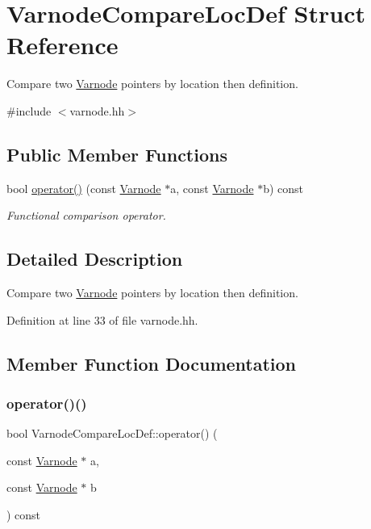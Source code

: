 \hypertarget{struct_varnode_compare_loc_def}{}\section{Varnode\+Compare\+Loc\+Def Struct Reference}
\label{struct_varnode_compare_loc_def}


Compare two \mbox{\hyperlink{class_varnode}{Varnode}} pointers by location then definition.  




{\ttfamily \#include $<$varnode.\+hh$>$}

\subsection*{Public Member Functions}
\begin{DoxyCompactItemize}
\item 
bool \mbox{\hyperlink{struct_varnode_compare_loc_def_a8874edc42984b5bf108b5ff6dc0d054f}{operator()}} (const \mbox{\hyperlink{class_varnode}{Varnode}} $\ast$a, const \mbox{\hyperlink{class_varnode}{Varnode}} $\ast$b) const
\begin{DoxyCompactList}\small\item\em Functional comparison operator. \end{DoxyCompactList}\end{DoxyCompactItemize}


\subsection{Detailed Description}
Compare two \mbox{\hyperlink{class_varnode}{Varnode}} pointers by location then definition. 

Definition at line 33 of file varnode.\+hh.



\subsection{Member Function Documentation}
\mbox{\label{struct_varnode_compare_loc_def_a8874edc42984b5bf108b5ff6dc0d054f}} 
\subsubsection{\texorpdfstring{operator()()}{operator()()}}
{\footnotesize\ttfamily bool Varnode\+Compare\+Loc\+Def\+::operator() (\begin{DoxyParamCaption}\item[{const \mbox{\hyperlink{class_varnode}{Varnode}} $\ast$}]{a,  }\item[{const \mbox{\hyperlink{class_varnode}{Varnode}} $\ast$}]{b }\end{DoxyParamCaption}) const\hspace{0.3cm}{\ttfamily [inline]}}



